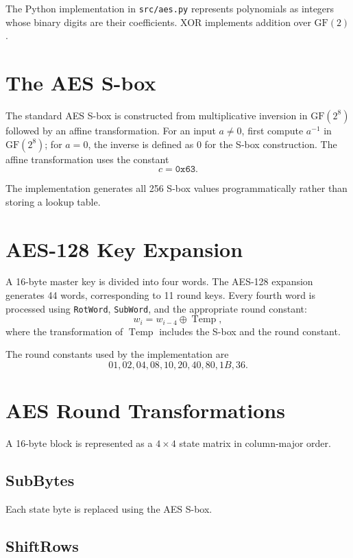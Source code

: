 \documentclass[11pt,a4paper]{article}
\begin{document}
The Python implementation in \texttt{src/aes.py} represents polynomials as
integers whose binary digits are their coefficients. XOR implements addition
over $\mathrm{GF}(2)$.

\section{The AES S-box}

The standard AES S-box is constructed from multiplicative inversion in
$\mathrm{GF}(2^8)$ followed by an affine transformation. For an input
$a\neq0$, first compute $a^{-1}$ in $\mathrm{GF}(2^8)$; for $a=0$, the inverse
is defined as $0$ for the S-box construction. The affine transformation uses
the constant
\[
c=\texttt{0x63}.
\]

The implementation generates all 256 S-box values programmatically rather
than storing a lookup table.

\section{AES-128 Key Expansion}

A 16-byte master key is divided into four words. The AES-128 expansion
generates 44 words, corresponding to 11 round keys. Every fourth word is
processed using \texttt{RotWord}, \texttt{SubWord}, and the appropriate round
constant:
\[
w_i=w_{i-4}\oplus \operatorname{Temp},
\]
where the transformation of $\operatorname{Temp}$ includes the S-box and
the round constant.

The round constants used by the implementation are
\[
01,02,04,08,10,20,40,80,1B,36.
\]

\section{AES Round Transformations}

A 16-byte block is represented as a $4\times4$ state matrix in column-major
order.

\subsection{SubBytes}

Each state byte is replaced using the AES S-box.

\subsection{ShiftRows}
\end{document}
